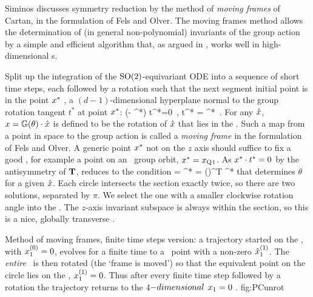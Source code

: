 Siminos discusses symmetry reduction by the
method of {\em moving frames} of Cartan, in the
formulation of Fels and
Olver.
The moving frames method allows the determination of (in
general non-polynomial) invariants of the group action by a
simple and efficient algorithm that, as argued in
, works well in high-dimensional \statesp s.
     

Split up the integration of the $\textrm{SO}(2)$-equivariant ODE into
a sequence of short time steps, each followed by a rotation
such that the next segment initial point is in the point
$x^{*}$ {\slice}, a $(d\!-\!1)$-dimensional hyperplane
normal to the group rotation tangent $t^{*}$ at point
$x^{*}$:
\beq
(\ssp- \ssp^{*}) \cdot t^{*}=0
    \,,\qquad
t^{*} = \Lg \cdot \ssp^{*}
\,.
For any $\hat{x}$, $x =
\mathbb{G}(\theta)\cdot\hat{x}$ is defined to be the
rotation of $\hat{x}$ that lies in the \slice. Such a
map from a point in space to the group action is called a
\emph{moving frame} in the formulation of Fels and
Olver. A generic point
$x^{*}$ not on the $z$ axis should suffice to fix a good
\slice, for example a point on an \reqv\ group orbit,
$x^{*} = x_{\mathrm{Q}_{}1}$.
As $x^{*} \cdot t^{*}=0$ by the antisymmetry of
$\mathbf{T}$,  reduces to the condition
 = \ssp \cdot \Lg \cdot \ssp^{*}
	=\hat{\ssp} \cdot {}(\theta)^T \cdot \Lg \cdot \ssp^{*}
that determines $\theta$ for a given $\hat{x}$. Each
circle intersects the section exactly twice,  so there are
two solutions, separated by $\pi$. We select the one
with a smaller clockwise rotation angle into the \slice.
The $z$-axis invariant subspace is always within the section,
so this is a nice, globally transverse \slice.

{}{
Method of moving frames, finite time steps version: a
trajectory started on the \slice, with $x_1^{(0)}
=0$, evolves for a finite time to a \statesp\ point with a
non-zero $\hat{x}_1^{(1)}$. The {\em entire} \statesp\ is then
rotated (the `frame is moved') so that the equivalent point
on the circle lies on the \slice, $x_1^{(1)} =0$.
Thus after every finite time step followed by a rotation the
trajectory returns to the 4$-dimensional$ $x_1 =0$
\reducedsp.
}
{fig:PCunrot}

